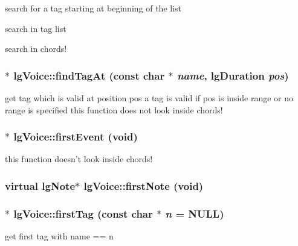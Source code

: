 search for a tag starting at beginning of the list 

search in tag list

search in chords! 
\subsubsection{ $\ast$ lg\-Voice::find\-Tag\-At (const char $\ast$ {\em name}, {\bf lg\-Duration} {\em pos})\hspace{0.3cm}{\tt  [virtual]}}\label{classlgVoice_a3}


get tag which is valid at position pos a tag is valid if pos is inside range or no range is specified this function does not look inside chords! 
\subsubsection{ $\ast$ lg\-Voice::first\-Event (void)\hspace{0.3cm}{\tt  [virtual]}}\label{classlgVoice_a12}


this function doesn't look inside chords! 

\subsubsection{\setlength{\rightskip}{0pt plus 5cm}virtual {\bf lg\-Note}$\ast$ lg\-Voice::first\-Note (void)\hspace{0.3cm}{\tt  [inline, virtual]}}\label{classlgVoice_a14}


\subsubsection{ $\ast$ lg\-Voice::first\-Tag (const char $\ast$ {\em n} = NULL)\hspace{0.3cm}{\tt  [virtual]}}\label{classlgVoice_a17}


get first tag with name == n 

